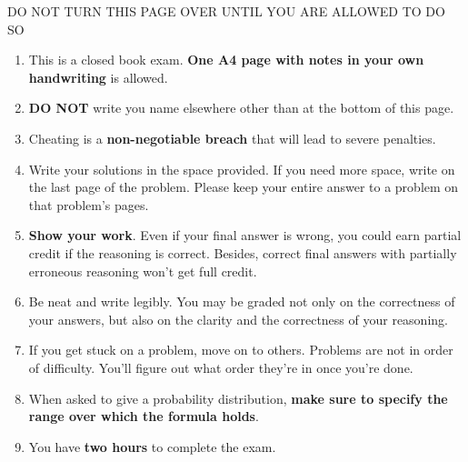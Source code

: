 \documentclass[article,12pt,a4paper]{article}
\newcounter{num}  %
\begin{document}
	\newpage
	
	
	
	
	\maketitle
	
	\begin{center}
		\huge{	DO NOT TURN THIS PAGE OVER UNTIL YOU ARE ALLOWED TO DO SO}
	\end{center}
	
	\thispagestyle{empty} 
	\bigskip
	
	\begin{enumerate}
		\item This is a closed book exam. \textbf{One A4 page with notes in
			your own handwriting} is allowed.
			\item \textbf{DO NOT} write you name elsewhere other than at the bottom of this page.
		\item Cheating is a \textbf{non-negotiable breach} that will lead to severe penalties.	
		\item Write your solutions in the space provided. If you need more space, write on the last page of the problem. Please keep your entire answer to a problem on that problem's pages.
		\item \textbf{Show your work}. Even if your final answer is wrong, you could earn partial credit if the reasoning is correct. 
		Besides, correct final answers with partially erroneous reasoning won't get full credit.
		\item Be neat and write legibly. You may be graded not only on the correctness of your answers, but also on the clarity and the correctness of your reasoning.
		\item If you get stuck on a problem, move on to others. 
		Problems are not in order of difficulty.
		You'll figure out what order they're in once you're done.
		\item When asked to give a probability distribution, \textbf{make sure to specify the range over which the formula holds}.
		\item You have \textbf{two hours} to complete the exam.
	\end{enumerate}
	
\end{document}
